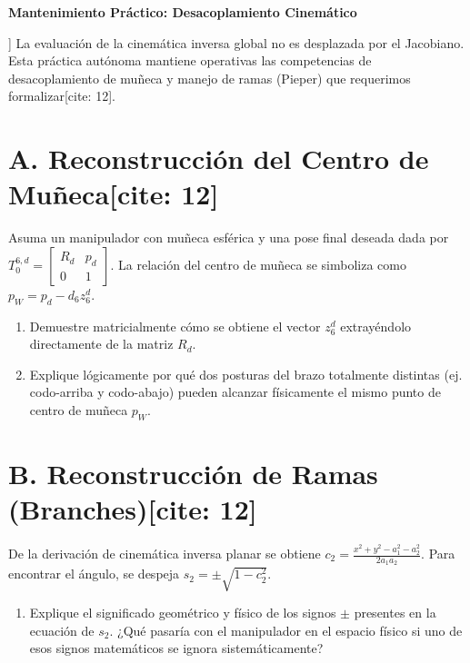 \documentclass[11pt, a4paper]{article}
\begin{document}
\begin{center}
    \Large\textbf{\textcolor{ucbblue}{Mantenimiento Práctico: Desacoplamiento Cinemático}}\\[0.2cm]
\end{center}

\begin{tcolorbox}[colback=gray!5, colframe=gray!50, title=\textbf{Propósito}[cite: 12]]
    La evaluación de la cinemática inversa global no es desplazada por el Jacobiano. Esta práctica autónoma mantiene operativas las competencias de desacoplamiento de muñeca y manejo de ramas (Pieper) que requerimos formalizar[cite: 12].
\end{tcolorbox}

\section*{A. Reconstrucción del Centro de Muñeca[cite: 12]}
Asuma un manipulador con muñeca esférica y una pose final deseada dada por $T_0^{6,d} = \begin{bmatrix} R_d & p_d \\ 0 & 1 \end{bmatrix}$. La relación del centro de muñeca se simboliza como $p_W = p_d - d_6 z_6^d$.
\begin{enumerate}
    \item Demuestre matricialmente cómo se obtiene el vector $z_6^d$ extrayéndolo directamente de la matriz $R_d$.
    \item Explique lógicamente por qué dos posturas del brazo totalmente distintas (ej. codo-arriba y codo-abajo) pueden alcanzar físicamente el mismo punto de centro de muñeca $p_W$.
\end{enumerate}
\vspace{3cm}

\section*{B. Reconstrucción de Ramas (Branches)[cite: 12]}
De la derivación de cinemática inversa planar se obtiene $c_2 = \frac{x^2+y^2-a_1^2-a_2^2}{2a_1 a_2}$. Para encontrar el ángulo, se despeja $s_2 = \pm\sqrt{1-c_2^2}$.
\begin{enumerate}
    \item Explique el significado geométrico y físico de los signos $\pm$ presentes en la ecuación de $s_2$. ¿Qué pasaría con el manipulador en el espacio físico si uno de esos signos matemáticos se ignora sistemáticamente?
\end{enumerate}
\vspace{3cm}
\end{document}
